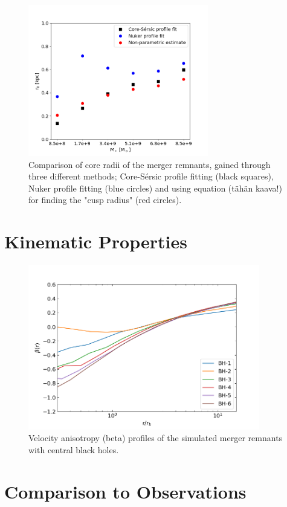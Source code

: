 \documentclass[english, oneside]{HYgradu}
\begin{document}
\begin{figure}[h]
	\centering
	\includegraphics[width=0.7\textwidth]{rb_mass_relation.png}
	\caption{Comparison of core radii of the merger remnants, gained through three different methods; Core-Sérsic profile fitting (black squares), Nuker profile fitting (blue circles) and using equation (tähän kaava!) for finding the "cusp radius" (red circles).}
\end{figure}

\section{Kinematic Properties}

\begin{figure}[h]
	\centering
	\includegraphics[width=0.9\textwidth]{beta.png}
	\caption{Velocity anisotropy (beta) profiles of the simulated merger remnants with central black holes.}
\end{figure}

\section{Comparison to Observations}
\end{document}
